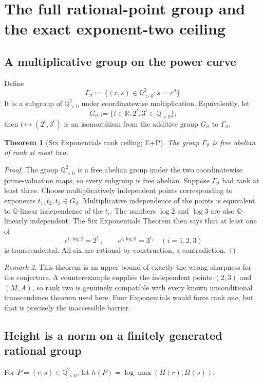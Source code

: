 \documentclass[10pt,oneside]{article}
\newtheorem{theorem}{Theorem}[section]
\theoremstyle{definition}
\theoremstyle{remark}
\newtheorem{remark}[theorem]{Remark}
\newcommand{\Q}{\mathbb Q}
\newcommand{\R}{\mathbb R}
\newcommand{\thetaq}{\vartheta}
\newcommand{\statusP}{\textsc{P}}
\newcommand{\statusE}{\textsc{E}}
\begin{document}
\section{The full rational-point group and the exact exponent-two ceiling}
\label{sec:rational-group}

\subsection{A multiplicative group on the power curve}
Define
\[
 \Gamma_{\thetaq}:=
 \{(r,s)\in\Q_{>0}^2:s=r^{\thetaq}\}.
\]
It is a subgroup of \(\Q_{>0}^2\) under coordinatewise multiplication.  Equivalently, let
\[
 G_{\thetaq}:=
 \{t\in\R:2^t,3^t\in\Q_{>0}\};
\]
then \(t\mapsto(2^t,3^t)\) is an isomorphism from the additive group \(G_{\thetaq}\) to \(\Gamma_{\thetaq}\).

\begin{theorem}[Six Exponentials rank ceiling; \statusE+\statusP]
\label{thm:six-exp-rank}
The group \(\Gamma_{\thetaq}\) is free abelian of rank at most two.
\end{theorem}

\begin{proof}
The group \(\Q_{>0}^2\) is a free abelian group under the two coordinatewise prime-valuation maps, so every subgroup is free abelian.  Suppose \(\Gamma_{\thetaq}\) had rank at least three.  Choose multiplicatively independent points corresponding to exponents \(t_1,t_2,t_3\in G_{\thetaq}\).  Multiplicative independence of the points is equivalent to \(\Q\)-linear independence of the \(t_i\).  The numbers \(\log2\) and \(\log3\) are also \(\Q\)-linearly independent.  The Six Exponentials Theorem \cite{Lang1966} then says that at least one of
\[
 e^{t_i\log2}=2^{t_i},
 \qquad
 e^{t_i\log3}=3^{t_i}
 \quad (i=1,2,3)
\]
is transcendental.  All six are rational by construction, a contradiction.
\end{proof}

\begin{remark}
This theorem is an upper bound of exactly the wrong sharpness for the conjecture.  A counterexample supplies the independent points \((2,3)\) and \((M,A)\), so rank two is genuinely compatible with every known unconditional transcendence theorem used here.  Four Exponentials would force rank one, but that is precisely the inaccessible barrier.
\end{remark}

\subsection{Height is a norm on a finitely generated rational group}
For \(P=(r,s)\in\Q_{>0}^2\), let \(h(P)=\log\max(H(r),H(s))\).
\end{document}
